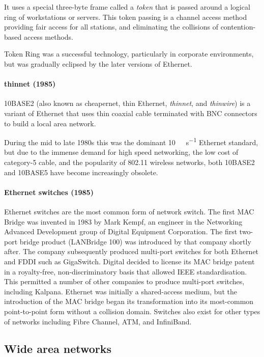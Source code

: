 {It uses a special three-byte frame called a \emph{token} that is passed around a logical ring of workstations or servers.
This token passing is a channel access method providing fair access for all stations, and eliminating the collisions of contention-based access methods.

Token Ring was a successful technology, particularly in corporate environments, but was gradually eclipsed by the later versions of Ethernet.

\paragraph{thinnet (1985)}
10BASE2 (also known as cheapernet, thin Ethernet, \emph{thinnet}, and \emph{thinwire}) is a variant of Ethernet that uses thin coaxial cable terminated with BNC connectors to build a local area network.

During the mid to late 1980s this was the dominant \SI{10}{\mega\bit\per\second} Ethernet standard, but due to the immense demand for high speed networking, the low cost of category-5 cable, and the popularity of 802.11 wireless networks, both 10BASE2 and 10BASE5 have become increasingly obsolete.

\paragraph{Ethernet switches (1985)}
Ethernet switches are the most common form of network switch.
The first MAC Bridge was invented in 1983 by Mark Kempf, an engineer in the Networking Advanced Development group of Digital Equipment Corporation.
The first two-port bridge product (LANBridge 100) was introduced by that company shortly after.
The company subsequently produced multi-port switches for both Ethernet and FDDI such as GigaSwitch.
Digital decided to license its MAC bridge patent in a royalty-free, non-dis\-crim\-i\-na\-tory basis that allowed IEEE standardisation.
This permitted a number of other companies to produce multi-port switches, including Kalpana.
Ethernet was initially a shared-access medium, but the introduction of the MAC bridge began its transformation into its most-common point-to-point form without a collision domain.
Switches also exist for other types of networks including Fibre Channel, ATM, and InfiniBand.
    
\subsection{Wide area networks}
\label{sec:network-evoluation-wan}

}
